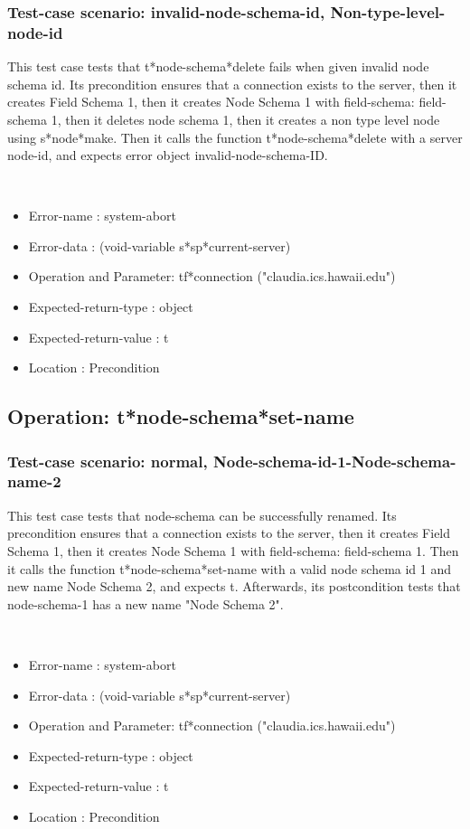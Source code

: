 \subsubsection {Test-case scenario: invalid-node-schema-id, Non-type-level-node-id}


This test case tests that t*node-schema*delete fails when given invalid node schema id.
Its precondition ensures that a connection exists to the server, then it creates Field Schema 1, then it creates Node Schema 1 with field-schema: field-schema 1, then it deletes node schema 1, then it creates a non type level node using s*node*make.
Then it calls the function t*node-schema*delete  with a server node-id, and expects error object invalid-node-schema-ID.



\
\begin {itemize}
\item 	Error-name             : system-abort
\item Error-data             : (void-variable s*sp*current-server)
\item Operation and Parameter: tf*connection ("claudia.ics.hawaii.edu")
\item Expected-return-type   : object
\item Expected-return-value  : t
\item Location               : Precondition



\end {itemize}
\subsection {Operation: t*node-schema*set-name}
\subsubsection {Test-case scenario: normal, Node-schema-id-1-Node-schema-name-2}


This test case tests that node-schema can be successfully renamed.
Its precondition ensures that a connection exists to the server, then it creates Field Schema 1, then it creates Node Schema 1 with field-schema: field-schema 1.
Then it calls the function t*node-schema*set-name  with a valid node schema id 1 and new name Node Schema 2, and expects t.
Afterwards, its postcondition tests that node-schema-1 has a new name "Node Schema 2".


\
\begin {itemize}
\item 	Error-name             : system-abort
\item Error-data             : (void-variable s*sp*current-server)
\item Operation and Parameter: tf*connection ("claudia.ics.hawaii.edu")
\item Expected-return-type   : object
\item Expected-return-value  : t
\item Location               : Precondition



\end {itemize}
